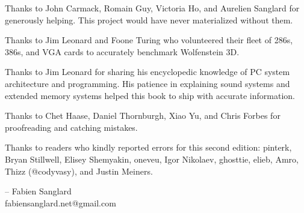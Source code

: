 Thanks to John Carmack, Romain Guy, Victoria Ho, and Aurelien Sanglard for generously helping. This project would have never
materialized without them.\\ 
\par
Thanks to  Jim Leonard and Foone Turing who volunteered their fleet of 286s, 386s, and VGA cards to accurately benchmark Wolfenstein 3D.\\
\par
Thanks to  Jim Leonard for sharing his encyclopedic knowledge of PC system architecture and programming. His patience in explaining sound systems and extended memory systems helped this book to ship with accurate information.\\
\par
Thanks to  Chet Haase, Daniel Thornburgh, Xiao Yu, and Chris Forbes for proofreading and catching mistakes.\\
\par
Thanks to readers who kindly reported errors for this second edition: pinterk, Bryan Stillwell, Elisey Shemyakin, oneveu, Igor Nikolaev, ghosttie, elieb, Amro, Thizz (@codyvasy), and Justin Meiners.\\
\par
-- Fabien Sanglard\\
fabiensanglard.net@gmail.com
